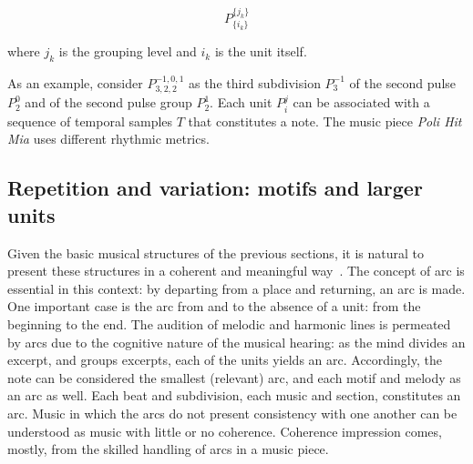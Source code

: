 \begin{equation}\label{eq:rhythmicUnit}
P^{ \{ j_k \} }_{ \{ i_{k} \}}
\end{equation}

\noindent where $j_k$ is the grouping level and $i_k$ is the unit itself.

As an example, consider $P^{-1,0,1}_{3,2,2}$ as the third subdivision $P^{-1}_3$ of the
second pulse $P^0_2$ and of the second pulse group $P^1_2$.
Each unit $P_i^j$ can be associated with a sequence of temporal samples $T$ that constitutes a
note. The music piece \emph{Poli Hit Mia} uses different rhythmic metrics.~\cite{MASSA}

\subsection{Repetition and variation: motifs and larger units}\label{subsec:motivos}
Given the basic musical structures of the previous sections, it is
natural to present these structures in a coherent and meaningful way~\cite{Boulez}.
The concept of arc is essential in this context: by departing from a place and returning, an arc is made. One important case is the arc from and to the absence of a unit: from the beginning to the end. The audition of melodic and harmonic lines is permeated by
arcs due to the cognitive nature of the musical hearing: as the mind divides an excerpt, and groups excerpts, each of the units yields an arc.
Accordingly, the note can be considered the smallest (relevant) arc, and each motif and melody as an arc as well.
Each beat and subdivision, each music and
section, constitutes an arc.
Music in which the arcs do not present consistency with one another can be understood as music with little or no coherence. Coherence impression
comes, mostly, from the skilled handling of arcs in a music piece.

